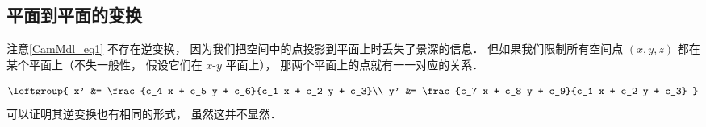 \subsection{平面到平面的变换}
注意\autoref{CamMdl_eq1} 不存在逆变换， 因为我们把空间中的点投影到平面上时丢失了景深的信息． 但如果我们限制所有空间点 $(x, y, z)$ 都在某个平面上（不失一般性， 假设它们在 $x$-$y$ 平面上）， 那两个平面上的点就有一一对应的关系．

\begin{equation}
\leftgroup{
x' &= \frac{c_4 x + c_5 y + c_6}{c_1 x + c_2 y + c_3}\\
y' &= \frac{c_7 x + c_8 y + c_9}{c_1 x + c_2 y + c_3}
}
\end{equation}
可以证明其逆变换也有相同的形式， 虽然这并不显然．
